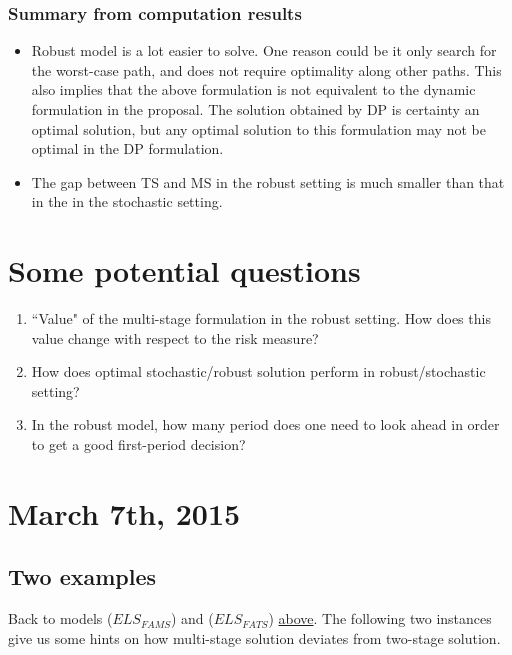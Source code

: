 \documentclass[10pt]{article}
\theoremstyle{plain}
\theoremstyle{definition}
\theoremstyle{remark}
\begin{document}
\subsubsection*{Summary from computation results}
\begin{itemize}
	\item {\color{blue} Robust model is a lot easier to solve.} One reason could be it only search for
	the worst-case path, and does not require optimality along other paths. This also implies that the above
	formulation is not equivalent to the dynamic formulation in the proposal. The solution obtained by
	DP is certainty an optimal solution, but any optimal solution to this formulation may not be optimal
	in the DP formulation. 
	\item {\color{blue} The gap between TS and MS in the robust setting is much smaller than that in the in the stochastic setting.}
\end{itemize}

{\color{red}\large
\section*{Some potential questions}
\begin{enumerate}\label{qlist_1}
\item ``Value" of the multi-stage formulation in the robust setting. How does this value change with respect to the risk measure?
\item How does optimal stochastic/robust solution perform in robust/stochastic setting?
\item In the robust model, how many period does one need to look ahead in order to get a good first-period decision?
\end{enumerate}
}

\section*{March 7th, 2015}
\subsection*{Two examples}
Back to models ($ELS_{FAMS}$) and ($ELS_{FATS}$) \hyperref[simplification]{above}.
The following two instances give us some hints on how multi-stage solution deviates from
two-stage solution.
\end{document}
